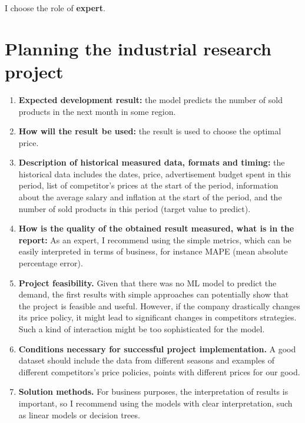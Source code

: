 \documentclass[12pt]{article}
\date{}
\begin{document}
\maketitle


I choose the role of \textbf{expert}.



\section{Planning the industrial research project}

\begin{enumerate}
\item \textbf{Expected development result:} the model predicts the number of sold products in the next month in some region.
\item \textbf{How will the result be used:} the result is used to choose the optimal price.
\item \textbf{Description of historical measured data, formats and timing:} the historical data includes the dates, price, advertisement budget spent in this period, list of competitor's prices at the start of the period, information about the average salary and inflation at the start of the period, and the number of sold products in this period (target value to predict).
\item \textbf{How is the quality of the obtained result measured, what is in the report:}
As an expert, I recommend using the simple metrics, which can be easily interpreted in terms of business, for instance MAPE (mean absolute percentage error).
\item \textbf{Project feasibility.} Given that there was no ML model to predict the demand, the first results with simple approaches can potentially show that the project is feasible and useful. However, if the company drastically changes its price policy, it might lead to significant changes in competitors strategies. Such a kind of interaction might be too sophisticated for the model.
\item \textbf{Conditions necessary for successful project implementation.} A good dataset should include the data from different seasons and examples of different competitors's price policies, points with different prices for our good.

\item \textbf{Solution methods.}
For business purposes, the interpretation of results is important, so I recommend using the models with clear interpretation, such as linear models or decision trees.
\end{enumerate}
\end{document}

